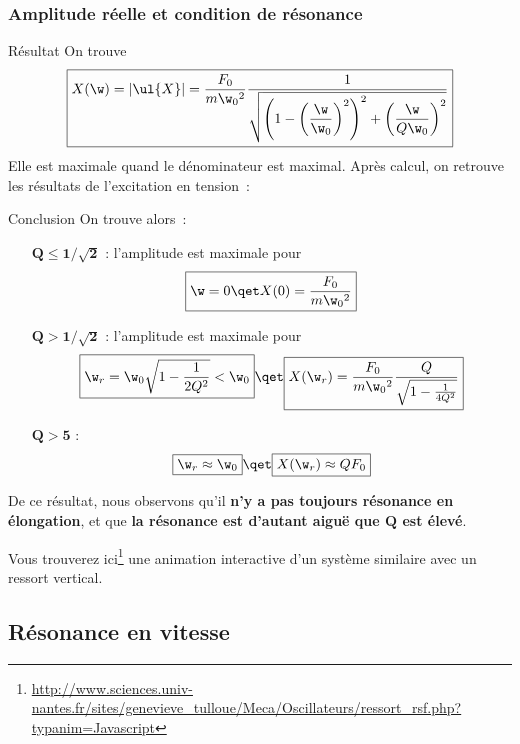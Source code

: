 \documentclass[../main/main.tex]{subfiles}
\begin{document}
\subsubsection{Amplitude réelle et condition de résonance}
\begin{rprop}{Résultat}
    On trouve
    \begin{gather*}
        \boxed{
        X(\w)
            = \left| \ul{X} \right|
            = \frac{F_0}{m\w_0{}^2}\frac{1}{
                    \sqrt{\left( 1 - \left(\dfrac{\w}{\w_0}\right)^2 \right)^2
                    + \left(\dfrac{\w}{Q\w_0}\right)^2}}
        }
    \end{gather*}
    Elle est maximale quand le dénominateur est maximal. Après calcul, on retrouve
    les résultats de l'excitation en tension~:
\end{rprop}
\begin{rror}{Conclusion}
    On trouve alors~:
    \begin{itemize}[leftmargin=60pt]
        \item[$\mathbf{Q \leq 1/\sqrt{2}}$] : l'amplitude est maximale pour
            \[\boxed{\w = 0 \qet X(0) = \frac{F_0}{m\w_0{}^2}}\]
        \item[$\mathbf{Q > 1/\sqrt{2}}$] : l'amplitude est maximale pour
            \[\boxed{\w_r = \w_0 \sqrt{1 - \frac{1}{2Q^2}} < \w_0}
                \qet
                \boxed{X(\w_r) = \frac{F_0}{m\w_0{}^2}
                    \frac{Q}{\sqrt{1 - \frac{1}{4Q^2}}}}
            \]
        \item[$\mathbf{Q > 5}$] :
            \[\boxed{\w_r \approx \w_0}
                \qet
                \boxed{X(\w_r) \approx QF_0}
            \]
    \end{itemize}
    De ce résultat, nous observons qu'il \textbf{n'y a pas toujours résonance en
    élongation}, et que \textbf{la résonance est d'autant aiguë que $\mathbf{Q}$
    est élevé}.
\end{rror}

Vous trouverez ici\footnote{\href{http://www.sciences.univ-nantes.fr/sites/genevieve\_tulloue/Meca/Oscillateurs/ressort\_rsf.php?typanim=Javascript}{http://www.sciences.univ-nantes.fr/sites/genevieve\_tulloue/Meca/Oscillateurs/ressort\_rsf.php?typanim=Javascript}} une animation interactive d'un système similaire avec un
ressort vertical.

\subsection{Résonance en vitesse}
\end{document}
